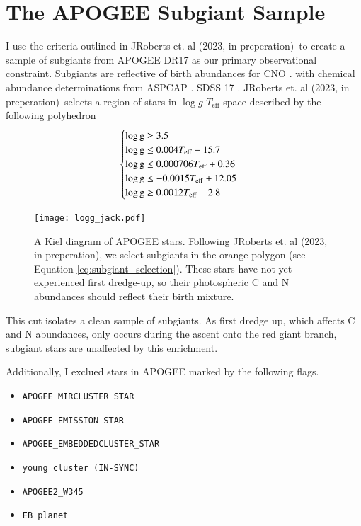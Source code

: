 \documentclass[12pt,oneside]{report}
\newcommand{\citetjack}{JRoberts et. al (2023, in preperation)}
\begin{document}
\section{The APOGEE Subgiant Sample}\label{sec:jack}

I use the criteria outlined in \citetjack~to create a sample of subgiants from APOGEE DR17 \cite{apogee17} as our primary observational constraint. Subgiants are reflective of birth abundances for CNO \citep{souto19}. with chemical abundance determinations from ASPCAP \citep{aspcap}. SDSS 17 \cite{sdss17}.
\citetjack~selects a region of stars in $\log g$-$T_\text{eff}$ space described by the following polyhedron
\begin{equation}
    \begin{cases} \label{eq:subgiant_selection}
        \log \text{g} \geq 3.5 \\
        \log \text{g} \leq 0.004T_{\rm eff} - 15.7 \\
        \log \text{g} \leq 0.000706T_{\rm eff} + 0.36 \\
        \log \text{g} \leq -0.0015T_{\rm eff} + 12.05 \\
        \log \text{g} \geq 0.0012T_{\rm eff} - 2.8 \\
    \end{cases}
\end{equation}

\begin{figure}
    \centering
    \texttt{[image: logg\_jack.pdf]}
    \caption[Subgiant selection]{
        A Kiel diagram of APOGEE stars. Following \citetjack, we select subgiants in the orange polygon (see Equation \ref{eq:subgiant_selection}). These stars have not yet experienced first dredge-up, so their photospheric C and N abundances should reflect their birth mixture.
    }
\end{figure}

This cut isolates a clean sample of subgiants. As first dredge up, which affects C and N abundances, only occurs during the ascent onto the red giant branch, subgiant stars are unaffected by this enrichment. 

Additionally, I exclued stars in APOGEE marked by the following flags.
\begin{itemize}
\item \verb|APOGEE_MIRCLUSTER_STAR|
\item \verb|APOGEE_EMISSION_STAR|
\item \verb|APOGEE_EMBEDDEDCLUSTER_STAR|
\item \verb|young cluster (IN-SYNC)|
\item \verb|APOGEE2_W345|
\item \verb|EB planet|
\end{itemize}
\end{document}
